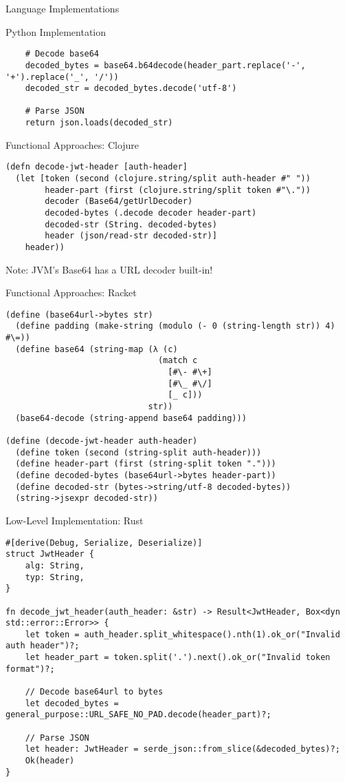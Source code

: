 \documentclass[presentation,aspectratio=169]{beamer}
\begin{document}
\begin{frame}[label={sec:orgcc4e74b},fragile]{Language Implementations}
\begin{block}{Python Implementation}
\begin{verbatim}
    # Decode base64
    decoded_bytes = base64.b64decode(header_part.replace('-', '+').replace('_', '/'))
    decoded_str = decoded_bytes.decode('utf-8')

    # Parse JSON
    return json.loads(decoded_str)
\end{verbatim}
\end{block}
\begin{block}{Functional Approaches: Clojure}
\begin{verbatim}
(defn decode-jwt-header [auth-header]
  (let [token (second (clojure.string/split auth-header #" "))
        header-part (first (clojure.string/split token #"\."))
        decoder (Base64/getUrlDecoder)
        decoded-bytes (.decode decoder header-part)
        decoded-str (String. decoded-bytes)
        header (json/read-str decoded-str)]
    header))
\end{verbatim}

\alert{Note}: JVM's Base64 has a URL decoder built-in!
\end{block}
\begin{block}{Functional Approaches: Racket}
\begin{verbatim}
(define (base64url->bytes str)
  (define padding (make-string (modulo (- 0 (string-length str)) 4) #\=))
  (define base64 (string-map (λ (c)
                               (match c
                                 [#\- #\+]
                                 [#\_ #\/]
                                 [_ c]))
                             str))
  (base64-decode (string-append base64 padding)))

(define (decode-jwt-header auth-header)
  (define token (second (string-split auth-header)))
  (define header-part (first (string-split token ".")))
  (define decoded-bytes (base64url->bytes header-part))
  (define decoded-str (bytes->string/utf-8 decoded-bytes))
  (string->jsexpr decoded-str))
\end{verbatim}
\end{block}
\begin{block}{Low-Level Implementation: Rust}
\begin{verbatim}
#[derive(Debug, Serialize, Deserialize)]
struct JwtHeader {
    alg: String,
    typ: String,
}

fn decode_jwt_header(auth_header: &str) -> Result<JwtHeader, Box<dyn std::error::Error>> {
    let token = auth_header.split_whitespace().nth(1).ok_or("Invalid auth header")?;
    let header_part = token.split('.').next().ok_or("Invalid token format")?;

    // Decode base64url to bytes
    let decoded_bytes = general_purpose::URL_SAFE_NO_PAD.decode(header_part)?;

    // Parse JSON
    let header: JwtHeader = serde_json::from_slice(&decoded_bytes)?;
    Ok(header)
}
\end{verbatim}
\end{block}
\end{frame}
\end{document}
